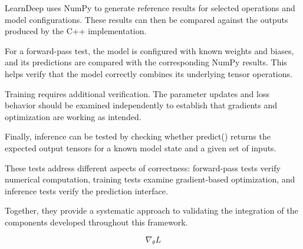 LearnDeep uses NumPy to generate reference results for
selected operations and model configurations. These
results can then be compared against the outputs produced
by the C++ implementation.

For a forward-pass test, the model is configured with
known weights and biases, and its predictions are compared
with the corresponding NumPy results. This helps verify
that the model correctly combines its underlying tensor
operations.

Training requires additional verification. The parameter
updates and loss behavior should be examined independently
to establish that gradients and optimization are working
as intended.

Finally, inference can be tested by checking whether
predict() returns the expected output tensors for a known
model state and a given set of inputs.

These tests address different aspects of correctness:
forward-pass tests verify numerical computation, training
tests examine gradient-based optimization, and inference
tests verify the prediction interface.

Together, they provide a systematic approach to validating
the integration of the components developed throughout
this framework.

\[
\nabla_\theta L
\]